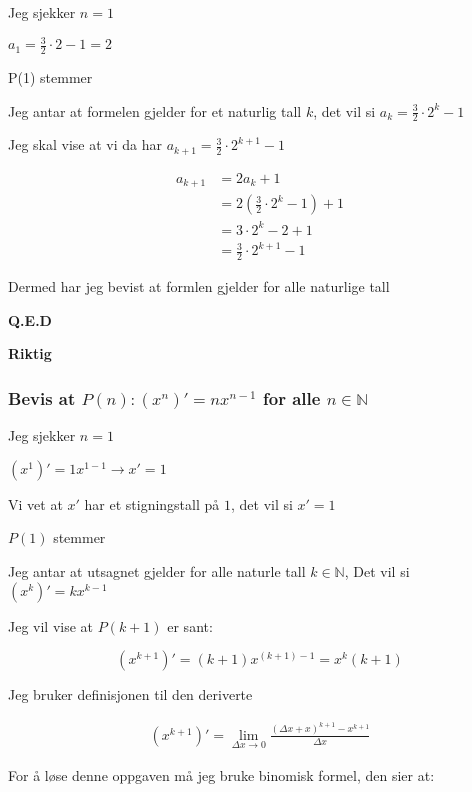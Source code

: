 \documentclass{article}
\begin{document}
Jeg sjekker $n=1$

$a_1=\frac{3}{2} \cdot 2 - 1 = 2$

P(1) stemmer

Jeg antar at formelen gjelder for et naturlig tall $k$, det vil si  $a_k=\frac{3}{2} \cdot 2^k - 1$

Jeg skal vise at vi da har $a_{k+1} = \frac{3}{2} \cdot 2^{k+1} - 1$

\begin{align*}
    a_{k+1} &= 2a_k+1 \\
    &= 2(\frac{3}{2} \cdot 2^{k} - 1) + 1 \\
    &= 3 \cdot 2^k - 2 + 1 \\
    &= \frac{3}{2} \cdot 2^{k+1} - 1
\end{align*}

Dermed har jeg bevist at formlen gjelder for alle naturlige tall

\textbf{Q.E.D}

\textbf{Riktig}

\subsubsection{Bevis at $P(n): (x^n)'= nx^{n-1}$ for alle $n \in \mathbb{N}$}

Jeg sjekker $n=1$

$(x^1)'= 1x^{1-1} \rightarrow x'=1$

Vi vet at $x'$ har et stigningstall på $1$, det vil si $x'= 1$

$P(1)$ stemmer

Jeg antar at utsagnet gjelder for alle naturle tall $k \in \mathbb{N}$, Det vil si $(x^k)' = kx^{k-1}$

Jeg vil vise at $P(k+1)$ er sant:

$$(x^{k+1})' = (k+1)x^{(k+1)-1} = x^k(k+1)$$

Jeg bruker definisjonen til den deriverte

\begin{align*}
    (x^{k+1})'=\lim_{\Delta x \rightarrow 0}\frac{(\Delta x + x)^{k+1}-x^{k+1}}{\Delta x}
\end{align*}

For å løse denne oppgaven må jeg bruke binomisk formel, den sier at:
\end{document}
